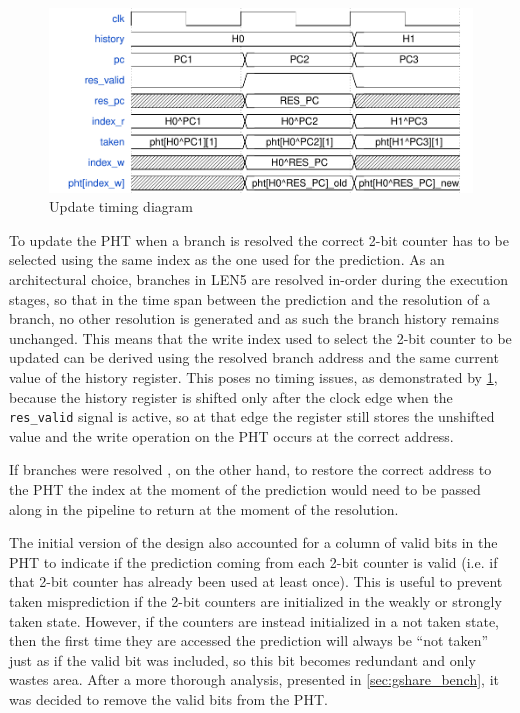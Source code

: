 \begin{figure}[hbt]
  \centering
  \includegraphics[width=.8\textwidth]{img/gshare01.pdf}
  \caption{Update timing diagram}
  \label{fig:gshare01}
\end{figure}
To update the \ac{PHT} when a branch is resolved the correct 2-bit counter has to be selected using the same index as the one used for the prediction. As an architectural choice, branches in LEN5 are resolved in-order during the execution stages, so that in the time span between the prediction and the resolution of a branch, no other resolution is generated and as such the branch history remains unchanged. This means that the write index used to select the 2-bit counter to be updated can be derived using the resolved branch address and the same current value of the history register. This poses no timing issues, as demonstrated by \cref{fig:gshare01}, because the history register is shifted only after the clock edge when the \texttt{res\_valid} signal is active, so at that edge the register still stores the unshifted value and the write operation on the \ac{PHT} occurs at the correct address.

If branches were resolved \ooo, on the other hand, to restore the correct address to the \ac{PHT} the index at the moment of the prediction would need to be passed along in the pipeline to return at the moment of the resolution. 

The initial version of the design also accounted for a column of valid bits in the \ac{PHT} to indicate if the prediction coming from each 2-bit counter is valid (i.e. if that 2-bit counter has already been used at least once). This is useful to prevent taken misprediction if the 2-bit counters are initialized in the weakly or strongly taken state. However, if the counters are instead initialized in a not taken state, then the first time they are accessed the prediction will always be ``not taken'' just as if the valid bit was included, so this bit becomes redundant and only wastes area. After a more thorough analysis, presented in \cref{sec:gshare_bench}, it was decided to remove the valid bits from the \ac{PHT}.

